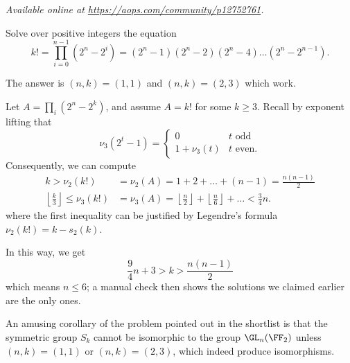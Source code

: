 \textsl{Available online at \url{https://aops.com/community/p12752761}.}
\begin{mdframed}[style=mdpurplebox,frametitle={Problem statement}]
Solve over positive integers the equation
\[ k! = \prod_{i=0}^{n-1} (2^n-2^i)
  = (2^n-1)(2^n-2)(2^n-4) \dots (2^n-2^{n-1}). \]
\end{mdframed}
The answer is $(n,k) =(1,1)$ and $(n,k) = (2,3)$ which work.

Let $A = \prod_i (2^n-2^k)$, and assume $A = k!$ for some $k \ge 3$.
Recall by exponent lifting that
\[ \nu_3(2^t-1) = \begin{cases}
    0 & t \text{ odd} \\
    1 + \nu_3(t) & t \text{ even}.
  \end{cases} \]
Consequently, we can compute
\begin{align*}
  k > \nu_2(k!) &= \nu_2(A) = 1 + 2 + \dots + (n-1) = \frac{n(n-1)}{2} \\
  \left\lfloor \frac k3 \right\rfloor
    \le \nu_3(k!) &= \nu_3(A) = \left\lfloor \frac n2 \right\rfloor
    + \left\lfloor \frac n6 \right\rfloor + \dots < \frac 34n.
\end{align*}
where the first inequality can be justified
by Legendre's formula $\nu_2(k!) = k - s_2(k)$.

In this way, we get
\[ \frac 94 n + 3 > k > \frac{n(n-1)}{2} \]
which means $n \le 6$; a manual check then shows the
solutions we claimed earlier are the only ones.

\begin{remark*}
  An amusing corollary of the problem pointed out in the shortlist
  is that the symmetric group $S_k$ cannot be isomorphic to the group $\GL_n(\FF_2)$
  unless $(n,k) = (1,1)$ or $(n,k) = (2,3)$, which indeed produce isomorphisms.
\end{remark*}
\pagebreak